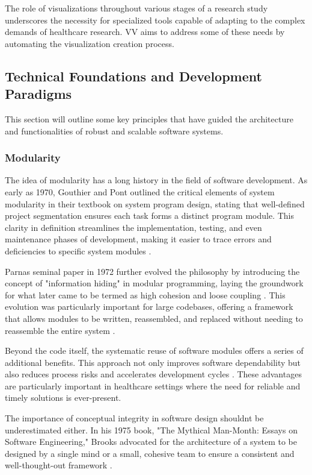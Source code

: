 The role of visualizations throughout various stages of a research study
underscores the necessity for specialized tools capable of adapting to
the complex demands of healthcare research. VV aims to address some of
these needs by automating the visualization creation process.

\subsection{Technical Foundations and Development
Paradigms}\label{technical-foundations-and-development-paradigms}

This section will outline some key principles that have guided the
architecture and functionalities of robust and scalable software
systems.

\subsubsection{Modularity}\label{modularity}

The idea of modularity has a long history in the field of software
development. As early as 1970, Gouthier and Pont outlined the critical
elements of system modularity in their textbook on system program
design, stating that well-defined project segmentation ensures each task
forms a distinct program module. This clarity in definition streamlines
the implementation, testing, and even maintenance phases of development,
making it easier to trace errors and deficiencies to specific system
modules \cite{16}.

Parnas\textquotesingle{} seminal paper in 1972 further evolved the
philosophy by introducing the concept of "information hiding" in modular
programming, laying the groundwork for what later came to be termed as
high cohesion and loose coupling
\cite{17}\cite{18}. This
evolution was particularly important for large codebases, offering a
framework that allows modules to be written, reassembled, and replaced
without needing to reassemble the entire system
\cite{17}.

Beyond the code itself, the systematic reuse of software modules offers
a series of additional benefits. This approach not only improves
software dependability but also reduces process risks and accelerates
development cycles
\cite{19}. These advantages
are particularly important in healthcare settings where the need for
reliable and timely solutions is ever-present.

The importance of conceptual integrity in software design
shouldn\textquotesingle t be underestimated either. In his 1975 book,
"The Mythical Man-Month: Essays on Software Engineering," Brooks
advocated for the architecture of a system to be designed by a single
mind or a small, cohesive team to ensure a consistent and
well-thought-out framework
\cite{20}.

